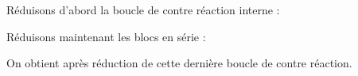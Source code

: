 \begin{center} 
    
\end{center}
Réduisons d'abord la boucle de contre réaction interne :
\begin{center}
    
\end{center}
Réduisons maintenant les blocs en série :
\begin{center}
    
\end{center}
On obtient après réduction de cette dernière boucle de contre réaction.
\begin{center}
    
\end{center}
